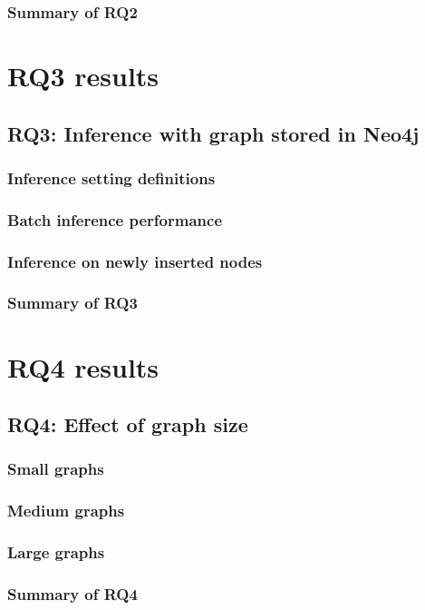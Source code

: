 \documentclass[PhD]{uclathes}
\begin{document}
\subsubsection{Summary of RQ2}

\section{RQ3 results}
\subsection{RQ3: Inference with graph stored in Neo4j}
\subsubsection{Inference setting definitions}
\subsubsection{Batch inference performance}
\subsubsection{Inference on newly inserted nodes}
\subsubsection{Summary of RQ3}

\section{RQ4 results}
\subsection{RQ4: Effect of graph size}
\subsubsection{Small graphs}
\subsubsection{Medium graphs}
\subsubsection{Large graphs}
\subsubsection{Summary of RQ4}
\end{document}
